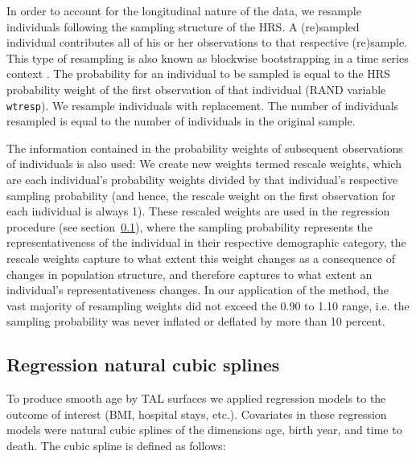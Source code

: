 \documentclass[12pt,oneside,a4paper]{article} %
\begin{document}
\begin{appendices}
In order to account for the longitudinal nature of the data, we resample individuals following the sampling structure of the HRS. A (re)sampled individual contributes all of his or her observations to that respective (re)sample. This type of resampling is also known as blockwise bootstrapping in a time series context \citep{buhlmann1995blockwise}. The probability for an individual to be sampled is equal to the HRS probability weight of the first observation of that individual (RAND variable \texttt{wtresp}). We resample individuals with replacement. The number of individuals resampled is equal to the number of individuals in the original sample.

The information contained in the probability weights of subsequent observations of individuals is also used: We create new weights termed rescale weights, which are each individual’s probability weights divided by that individual’s respective sampling probability (and hence, the rescale weight on the first observation for each individual is always 1). These rescaled weights are used in the regression procedure (see section~\ref{app:splinesreg}), where the sampling probability represents the representativeness of the individual in their respective demographic category, the rescale weights capture to what extent this weight changes as a consequence of changes in population structure, and therefore captures to what extent an individual’s representativeness changes. In our application of the method, the vast majority of resampling weights did not exceed the 0.90 to 1.10 range, i.e. the sampling probability was never inflated or deflated by more than 10 percent.

\subsection{Regression natural cubic splines}
\label{app:splinesreg}

To produce smooth age by TAL surfaces we applied regression models to the
outcome of interest (BMI, hospital stays, etc.). Covariates in these regression models were natural cubic splines of the dimensions age, birth year, and time to death. The cubic spline is defined as follows:


\end{appendices}
\end{document}
